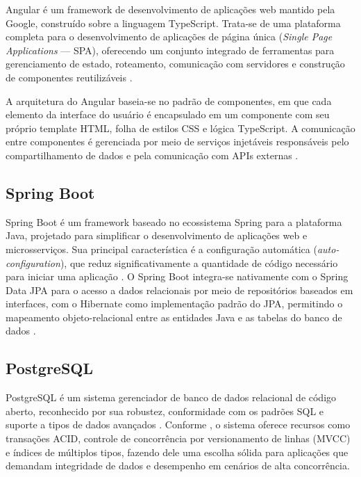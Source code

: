 \documentclass[12pt,a4paper,oneside]{abntspiifac}
\begin{document}
Angular é um framework de desenvolvimento de aplicações web mantido pela Google, construído sobre a linguagem TypeScript. Trata-se de uma plataforma completa para o desenvolvimento de aplicações de página única (\textit{Single Page Applications} — SPA), oferecendo um conjunto integrado de ferramentas para gerenciamento de estado, roteamento, comunicação com servidores e construção de componentes reutilizáveis \cite{fain2017}.

A arquitetura do Angular baseia-se no padrão de componentes, em que cada elemento da interface do usuário é encapsulado em um componente com seu próprio template HTML, folha de estilos CSS e lógica TypeScript. A comunicação entre componentes é gerenciada por meio de serviços injetáveis responsáveis pelo compartilhamento de dados e pela comunicação com APIs externas \cite{freeman2019}.

\subsection{Spring Boot}

Spring Boot é um framework baseado no ecossistema Spring para a plataforma Java, projetado para simplificar o desenvolvimento de aplicações web e microsserviços. Sua principal característica é a configuração automática (\textit{auto-configuration}), que reduz significativamente a quantidade de código necessário para iniciar uma aplicação \cite{walls2019}. O Spring Boot integra-se nativamente com o Spring Data JPA para o acesso a dados relacionais por meio de repositórios baseados em interfaces, com o Hibernate como implementação padrão do JPA, permitindo o mapeamento objeto-relacional entre as entidades Java e as tabelas do banco de dados \cite{bauer2015}.

\subsection{PostgreSQL}

PostgreSQL é um sistema gerenciador de banco de dados relacional de código aberto, reconhecido por sua robustez, conformidade com os padrões SQL e suporte a tipos de dados avançados \cite{obe2017}. Conforme , o sistema oferece recursos como transações ACID, controle de concorrência por versionamento de linhas (MVCC) e índices de múltiplos tipos, fazendo dele uma escolha sólida para aplicações que demandam integridade de dados e desempenho em cenários de alta concorrência.
\end{document}
